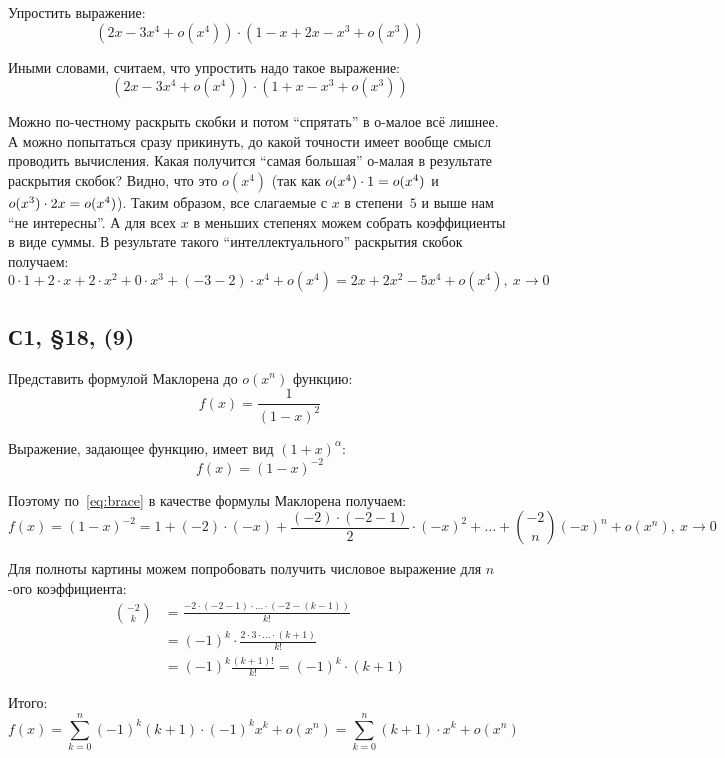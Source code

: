 \documentclass[a4paper,12pt]{article}
\begin{document}
  Упростить выражение:
  \[
    (2x - 3x^4 + o(x^4)) \cdot (1 - x + 2x - x^3 + o(x^3))
  \]
  
  \begin{solution}
    Иными словами, считаем, что упростить надо такое выражение:
    \[
      (2x - 3x^4 + o(x^4)) \cdot (1 + x - x^3 + o(x^3))
    \]
    
    Можно по-честному раскрыть скобки и потом ``спрятать'' в о-малое всё лишнее.
    А можно попытаться сразу прикинуть, до какой точности имеет вообще смысл проводить вычисления.
    Какая получится ``самая большая'' о-малая в результате раскрытия скобок?
    Видно, что это $o(x^4)$ (так как $o(x^4) \hm\cdot 1 \hm= o(x^4)$ и $o(x^3) \hm\cdot 2x \hm= o(x^4)$).
    Таким образом, все слагаемые с $x$ в степени~$5$ и выше нам ``не интересны''.
    А для всех $x$ в меньших степенях можем собрать коэффициенты в виде суммы.
    В результате такого ``интеллектуального'' раскрытия скобок получаем:
    \[
      0 \cdot 1 + 2 \cdot x + 2 \cdot x^2 + 0 \cdot x^3 + (-3 - 2) \cdot x^4 + o(x^4)
        = 2x + 2x^2 - 5x^4 + o(x^4),\ x \to 0
    \]
  \end{solution}
  
  
  
  
  
  \subsection{С1, \S 18, (9)}
  
  Представить формулой Маклорена до $o(x^n)$ функцию:
  \[
    f(x) = \frac{1}{(1 - x)^2}
  \]
  
  \begin{solution}
    Выражение, задающее функцию, имеет вид $(1 + x)^{\alpha}$:
    \[
      f(x) = (1 - x)^{-2}
    \]
    
    Поэтому по~\eqref{eq:brace} в качестве формулы Маклорена получаем:
    \[
      f(x) = (1 - x)^{-2} = 1 + (-2) \cdot (-x) + \frac{(-2) \cdot (-2 - 1)}{2} \cdot (-x)^2 + \ldots + \binom{-2}{n} (-x)^n + o(x^n),\ x \to 0
    \]
    
    Для полноты картины можем попробовать получить числовое выражение для $n$-ого коэффициента:
    \begin{equation*}
    \begin{split}
      \binom{-2}{k} &= \frac{-2 \cdot (-2 - 1) \cdot \ldots \cdot (-2 - (k - 1))}{k!}\\
        &= (-1)^k \cdot \frac{2 \cdot 3 \cdot \ldots \cdot (k + 1)}{k!}\\
        &= (-1)^k \frac{(k + 1)!}{k!} = (-1)^k \cdot (k + 1)
    \end{split}
    \end{equation*}
    
    Итого:
    \[
      f(x) = \sum_{k = 0}^n (-1)^k (k + 1) \cdot (-1)^k x^k + o(x^n)
        = \sum_{k = 0}^n (k + 1) \cdot x^k + o(x^n)
    \]
  \end{solution}
  
\end{document}
